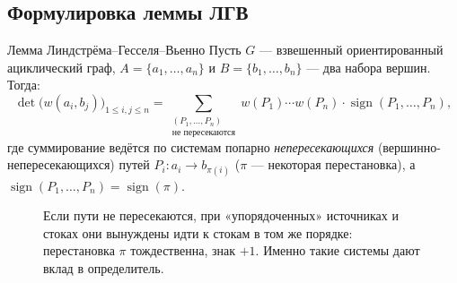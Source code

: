 \subsection{Формулировка леммы ЛГВ}

\begin{Theorem}{Лемма Линдстрёма–Гесселя–Вьенно}{}
	Пусть $G$ — взвешенный ориентированный ациклический граф,
	$A = \{a_1, \ldots, a_n\}$ и $B = \{b_1, \ldots, b_n\}$ — два набора вершин. Тогда:
	\[
	\det\!\bigl(w(a_i, b_j)\bigr)_{1\le i,j\le n}
	=
	\sum_{\substack{(P_1,\ldots,P_n) \\ \text{не пересекаются}}}
	w(P_1)\cdots w(P_n)\cdot\operatorname{sign}(P_1,\ldots,P_n),
	\]
	где суммирование ведётся по системам попарно \emph{непересекающихся} (вершинно-непересекающихся) путей
	$P_i : a_i \to b_{\pi(i)}$
	($\pi$ — некоторая перестановка), а
	$\operatorname{sign}(P_1,\ldots,P_n) = \operatorname{sign}(\pi)$.
\end{Theorem}


\begin{figure}[H]
	\centering
	\caption{Если пути не пересекаются, при «упорядоченных» источниках и стоках они вынуждены идти к стокам в том же порядке: перестановка $\pi$ тождественна, знак $+1$. Именно такие системы дают вклад в определитель.}
\end{figure}


